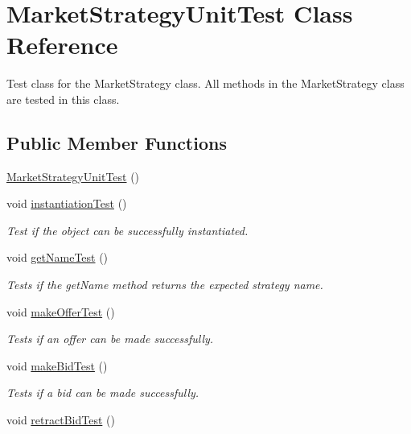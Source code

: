 \hypertarget{class_market_strategy_unit_test}{\section{Market\+Strategy\+Unit\+Test Class Reference}
\label{class_market_strategy_unit_test}
}


Test class for the Market\+Strategy class. All methods in the Market\+Strategy class are tested in this class.  


\subsection*{Public Member Functions}
\begin{DoxyCompactItemize}
\item 
\hyperlink{class_market_strategy_unit_test_ae43ac2b179784a2176d37163c075fe7d}{Market\+Strategy\+Unit\+Test} ()
\item 
void \hyperlink{class_market_strategy_unit_test_a2c787db378d0ffc243c850d6beb95064}{instantiation\+Test} ()
\begin{DoxyCompactList}\small\item\em Test if the object can be successfully instantiated. \end{DoxyCompactList}\item 
void \hyperlink{class_market_strategy_unit_test_a2a9c093d084ff000e490572c5761ecf5}{get\+Name\+Test} ()
\begin{DoxyCompactList}\small\item\em Tests if the get\+Name method returns the expected strategy name. \end{DoxyCompactList}\item 
void \hyperlink{class_market_strategy_unit_test_ab814f5c9983e0eaa02f7c5040b81971a}{make\+Offer\+Test} ()
\begin{DoxyCompactList}\small\item\em Tests if an offer can be made successfully. \end{DoxyCompactList}\item 
void \hyperlink{class_market_strategy_unit_test_a98b0ebe10401ed5d3c9af160dfcb8f2a}{make\+Bid\+Test} ()
\begin{DoxyCompactList}\small\item\em Tests if a bid can be made successfully. \end{DoxyCompactList}\item 
void \hyperlink{class_market_strategy_unit_test_aa0b0a03a9824cd06bc94c68d9c45042f}{retract\+Bid\+Test} ()

\end{DoxyCompactItemize}
